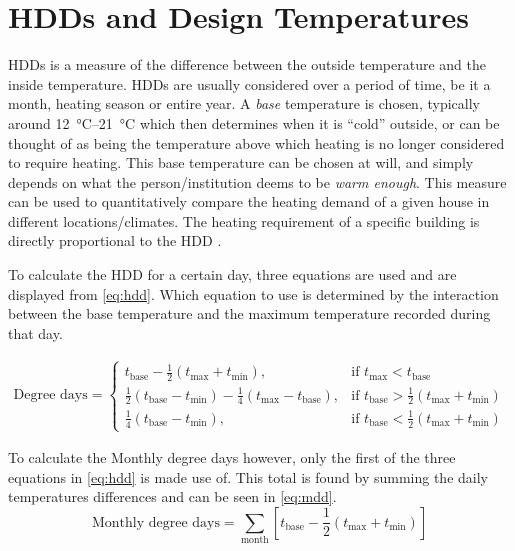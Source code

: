 \section{HDDs and Design Temperatures} \label{sec:hddanddesign}
\acp{HDD} is a measure of the difference between the outside temperature and the inside temperature. \acp{HDD} are usually considered over a period of time, be it a month, heating season or entire year. A \textit{base} temperature is chosen, typically around \qtyrange{12}{21}{\celsius} which then determines when it is ``cold'' outside, or can be thought of as being the temperature above which heating is no longer considered to require heating. This base temperature can be chosen at will, and simply depends on what the person/institution deems to be \textit{warm enough}. This measure can be used to quantitatively compare the heating demand of a given house in different locations/climates. The heating requirement of a specific building is directly proportional to the \ac{HDD} \cite{chartered_institution_of_building_services_engineers_environmental_2006}.

To calculate  the \ac{HDD} for a certain day, three equations are used and are displayed from \cref{eq:hdd}. Which equation to use is determined by the interaction between the base temperature and the maximum temperature recorded during that day.  

\begin{align}\label{eq:hdd}
    \text{Degree days} = \begin{cases}
        t_\text{base} - \frac12(t_\text{max} + t_\text{min}), & \text{if } t_\text{max} < t_\text{base}\\
        \frac12(t_\text{base} - t_\text{min}) -\frac14(t_\text{max} -t_\text{base} ), & \text{if } t_\text{base} > \frac12(t_\text{max} + t_\text{min}) \\
        \frac14(t_\text{base} -t_\text{min} ), & \text{if } t_\text{base} <\frac12(t_\text{max} + t_\text{min})
     \end{cases}  
\end{align}

To calculate the Monthly degree days however, only the first of the three equations in \cref{eq:hdd} is made use of. This total is found by summing the daily temperatures differences and can be seen in \cref{eq:mdd}.
\begin{equation}
    \text{Monthly degree days} = \displaystyle\sum_\text{month} \left[t_\text{base} - \frac12(t_\text{max} + t_\text{min})\right] \label{eq:mdd}
\end{equation}

